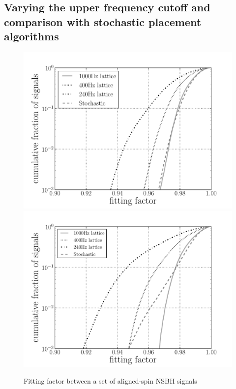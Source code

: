 \subsection{Varying the upper frequency cutoff and comparison with stochastic
placement algorithms}
\label{ssec:stoch_fup_compare}

\begin{figure}
    \centering
    \begin{minipage}[l]{\columnwidth}
    \centering
\includegraphics[width=1.0\textwidth]
{papers/nsbh_effectualness/figure6A.pdf}
\includegraphics[width=1.0\textwidth]
{papers/nsbh_effectualness/figure6B.pdf}
\caption{\label{fig:bankfcutoff}
Fitting factor between a set of aligned-spin \ac{NSBH} signals
}
\end{minipage}
\end{figure}
